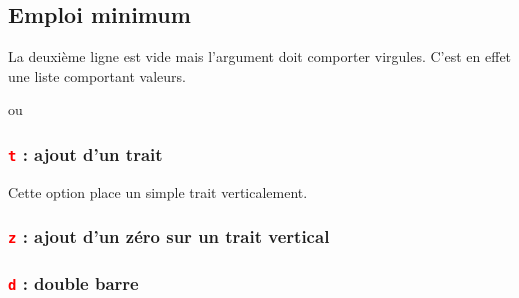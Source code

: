 \subsection{Emploi minimum}
La deuxième ligne est vide mais l'argument  doit comporter  virgules. C'est en effet une liste comportant  valeurs.

\begin{tkzexample}
 \tkzTabLine{,,,,} ou \tkzTabLine{ , , , , }\end{tkzexample}
 
\begin{tkzexample}[width=8cm,small]
\end{tkzexample}  

\subsubsection{\texttt{\textcolor{red}{t}} : ajout d'un trait} 
Cette option place un simple trait verticalement.
\begin{tkzexample}[width=8cm,small]
\end{tkzexample}  

\subsubsection{\texttt{\textcolor{red}{z}} : ajout d'un zéro sur un trait vertical}
\begin{tkzexample}[width=8cm,small]
\end{tkzexample}  

\subsubsection{\texttt{\textcolor{red}{d}} : double barre}

